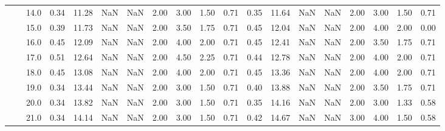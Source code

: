 \begin{tabular}{lllrrrrrrrrrrrrrrrr}
       &     & 14.0 &      0.34 &      11.28 &               NaN &                NaN & 2.00 &   3.00 &             1.50 &                         0.71 &      0.35 &      11.64 &               NaN &                NaN & 2.00 &   3.00 &             1.50 &                         0.71 \\
       &     & 15.0 &      0.39 &      11.73 &               NaN &                NaN & 2.00 &   3.50 &             1.75 &                         0.71 &      0.45 &      12.04 &               NaN &                NaN & 2.00 &   4.00 &             2.00 &                         0.00 \\
       &     & 16.0 &      0.45 &      12.09 &               NaN &                NaN & 2.00 &   4.00 &             2.00 &                         0.71 &      0.45 &      12.41 &               NaN &                NaN & 2.00 &   3.50 &             1.75 &                         0.71 \\
       &     & 17.0 &      0.51 &      12.64 &               NaN &                NaN & 2.00 &   4.50 &             2.25 &                         0.71 &      0.44 &      12.78 &               NaN &                NaN & 2.00 &   4.00 &             2.00 &                         0.71 \\
       &     & 18.0 &      0.45 &      13.08 &               NaN &                NaN & 2.00 &   4.00 &             2.00 &                         0.71 &      0.45 &      13.36 &               NaN &                NaN & 2.00 &   4.00 &             2.00 &                         0.71 \\
       &     & 19.0 &      0.34 &      13.44 &               NaN &                NaN & 2.00 &   3.00 &             1.50 &                         0.71 &      0.40 &      13.88 &               NaN &                NaN & 2.00 &   3.50 &             1.75 &                         0.71 \\
       &     & 20.0 &      0.34 &      13.82 &               NaN &                NaN & 2.00 &   3.00 &             1.50 &                         0.71 &      0.35 &      14.16 &               NaN &                NaN & 2.00 &   3.00 &             1.33 &                         0.58 \\
       &     & 21.0 &      0.34 &      14.14 &               NaN &                NaN & 2.00 &   3.00 &             1.50 &                         0.71 &      0.42 &      14.67 &               NaN &                NaN & 3.00 &   4.00 &             1.50 &                         0.58 \\

\end{tabular}
